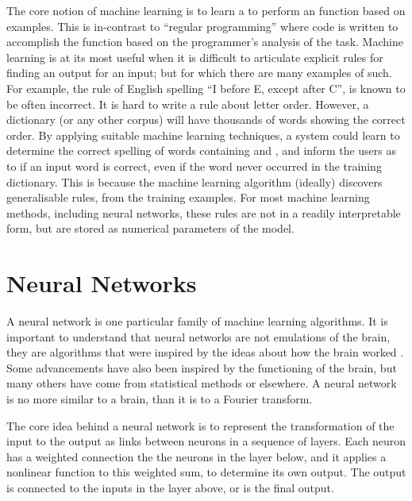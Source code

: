 \documentclass[12pt,parskip]{komatufte}\right
\begin{document}
The core notion of machine learning is to learn a to perform an function based on examples.
This is in-contrast to ``regular programming'' where code is written to accomplish the function based on the programmer's analysis of the task.
Machine learning is at its most useful when it is difficult to articulate explicit rules for finding an output for an input; but for which there are many examples of such.
For example, the rule of English spelling ``I before E, except after C'', is known to be often incorrect.
It is hard to write a rule about letter order.
However, a dictionary (or any other corpus) will have thousands of words showing the correct order.
By applying suitable machine learning techniques,
a system could learn to determine the correct spelling of words containing  and ,
and inform the users as to if an input word is correct, even if the word never occurred in the training dictionary.
This is because the machine learning algorithm (ideally) discovers generalisable rules, from the training examples.
For most machine learning methods, including neural networks, these rules are not in a readily interpretable form, but are stored as numerical parameters of the model.

\section{Neural Networks}

A neural network is one particular family of machine learning algorithms.
It is important to understand that neural networks are not emulations of the brain,
they are algorithms that were inspired by the ideas about how the brain worked .
Some advancements have also been inspired by the functioning of the brain,
but many others have come from statistical methods or elsewhere.
A neural network is no more similar to a brain, than it is to a Fourier transform.

The core idea behind a neural network is to represent the transformation of the input to the output as links between neurons in a sequence of layers.
Each neuron has a weighted connection the the neurons in the layer below,
and it applies a nonlinear function to this weighted sum, 
to determine its own output.
The output is connected to the inputs in the layer above, or is the final output.
\end{document}
